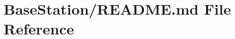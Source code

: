 \hypertarget{BaseStation_2README_8md}{\section{Base\-Station/\-R\-E\-A\-D\-M\-E.md File Reference}
\label{BaseStation_2README_8md}
}
